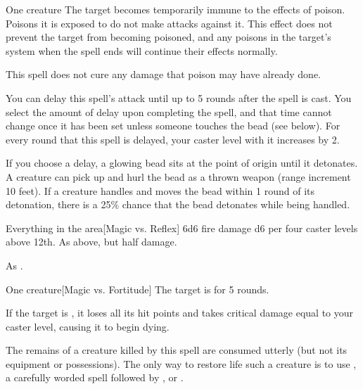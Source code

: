 \spellrng{\rngclose}
\spelldur{\durshort}
\begin{spelltarget}{One creature}
    \spelleffect The target becomes temporarily immune to the effects of poison. Poisons it is exposed to do not make attacks against it. This effect does not prevent the target from becoming poisoned, and any poisons in the target's system when the spell ends will continue their effects normally. 
\end{spelltarget}
\spellnotes This spell does not cure any damage that poison may have already done.

\spellline
\spelleffect You can delay this spell's attack until up to 5 rounds after the spell is cast. You select the amount of delay upon completing the spell, and that time cannot change once it has been set unless someone touches the bead (see below). For every round that this spell is delayed, your caster level with it increases by 2.

If you choose a delay, a glowing bead sits at the point of origin until it detonates. A creature can pick up and hurl the bead as a thrown weapon (range increment 10 feet). If a creature handles and moves the bead within 1 round of its detonation, there is a 25\% chance that the bead detonates while being handled.
\begin{spelltargets}{Everything in the area}[Magic vs. Reflex]
    \spellsuccess 6d6 fire damage \add d6 per four caster levels above 12th.
    \spellfailure As above, but half damage.
\end{spelltargets}

\spellnotes As .

\spellrng{\rngclose}
\begin{spelltarget}{One creature}[Magic vs. Fortitude]
    \spellsuccess The target is \staggered for 5 rounds.

    If the target is \bloodied, it loses all its hit points and takes critical damage equal to your caster level, causing it to begin dying.
\end{spelltarget}
\spellnotes The remains of a creature killed by this spell are consumed utterly (but not its equipment or possessions). The only way to restore life such a creature is to use , a carefully worded  spell followed by , or .

